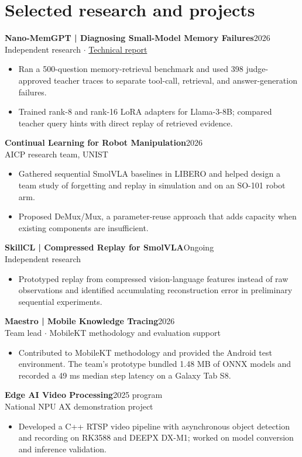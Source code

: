 \documentclass[10pt,a4paper]{article}
\begin{document}
\section{Selected research and projects}
\textbf{Nano-MemGPT | Diagnosing Small-Model Memory Failures}\hfill {\small 2026}\\
{\small Independent research $\cdot$ \href{https://github.com/HYO-AI-UNIST/Nano-MemGPT/blob/602729559ca1d2c6183f50614db791fcc6a22358/docs/latex/final_paper.pdf}{Technical report}}
\begin{itemize}
\item Ran a 500-question memory-retrieval benchmark and used 398 judge-approved teacher traces to separate tool-call, retrieval, and answer-generation failures.
\item Trained rank-8 and rank-16 LoRA adapters for Llama-3-8B; compared teacher query hints with direct replay of retrieved evidence.
\end{itemize}
\textbf{Continual Learning for Robot Manipulation}\hfill {\small 2026}\\
{\small AICP research team, UNIST}
\begin{itemize}
\item Gathered sequential SmolVLA baselines in LIBERO and helped design a team study of forgetting and replay in simulation and on an SO-101 robot arm.
\item Proposed DeMux/Mux, a parameter-reuse approach that adds capacity when existing components are insufficient.
\end{itemize}
\textbf{SkillCL | Compressed Replay for SmolVLA}\hfill {\small Ongoing}\\
{\small Independent research}
\begin{itemize}
\item Prototyped replay from compressed vision-language features instead of raw observations and identified accumulating reconstruction error in preliminary sequential experiments.
\end{itemize}
\textbf{Maestro | Mobile Knowledge Tracing}\hfill {\small 2026}\\
{\small Team lead $\cdot$ MobileKT methodology and evaluation support}
\begin{itemize}
\item Contributed to MobileKT methodology and provided the Android test environment. The team's prototype bundled 1.48 MB of ONNX models and recorded a 49 ms median step latency on a Galaxy Tab S8.
\end{itemize}
\textbf{Edge AI Video Processing}\hfill {\small 2025 program}\\
{\small National NPU AX demonstration project}
\begin{itemize}
\item Developed a C++ RTSP video pipeline with asynchronous object detection and recording on RK3588 and DEEPX DX-M1; worked on model conversion and inference validation.
\end{itemize}
\end{document}
